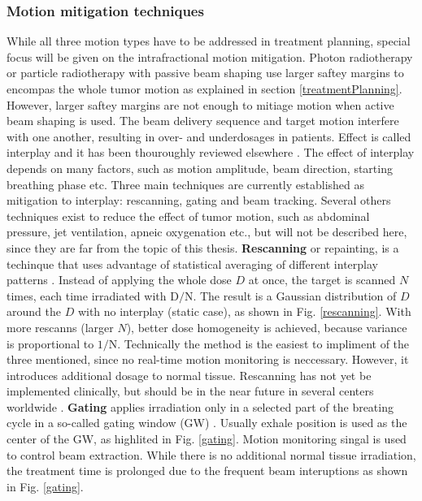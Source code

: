 \documentclass[type=dr, dr=rernat, accentcolor=tud7b,colorbacktitle, bigchapter, openright, twoside, 12pt ]{tudthesis}
\begin{document}
\subsubsection{Motion mitigation techniques}


While all three motion types have to be addressed in treatment planning, special focus will be given on the intrafractional motion mitigation. Photon radiotherapy or particle radiotherapy with passive beam shaping 
use larger saftey margins to encompas the whole tumor motion as explained in section \ref{treatmentPlanning}. However, larger saftey margins are not enough to mitiage motion when active beam shaping is used. The beam delivery 
sequence and target motion interfere with one another, resulting in over- and underdosages in patients. Effect is called interplay and it has been thouroughly reviewed elsewhere \cite{Phillips1992,Bert2008}. The effect of interplay depends
on many factors, such as motion amplitude, beam direction, starting breathing phase etc. Three main techniques are currently established as mitigation to interplay: rescanning, gating and beam tracking. Several others techniques exist
to reduce the effect of tumor motion, such as abdominal pressure, jet ventilation, apneic oxygenation etc., but will not be described here, since they are far from the topic of this thesis.
\newline
\textbf{Rescanning} or repainting, is a techinque that uses advantage of statistical averaging of different interplay patterns \cite{Phillips1992}. Instead of applying the whole dose $D$ at once, the target is scanned $N$ times, each
time irradiated with $\mathrm{D}/\mathrm{N}$. The result is a Gaussian distribution of $D$ around the $D$ with no interplay (static case), as shown in Fig. \ref{rescanning}. With more rescanns (larger $N$), better dose homogeneity is achieved, because variance is proportional
to $\mathrm{1}/\mathrm{N}$. Technically the method is the easiest to impliment of the three mentioned, since no real-time motion monitoring is neccessary. However, it introduces additional dosage to normal tissue. Rescanning has not yet be
implemented clinically, but should be in the near future in several centers worldwide \cite{Furukawa2007, Zenklusen2010}.
\newline
\textbf{Gating} applies irradiation only in a selected part of the breating cycle in a so-called gating window (GW) \cite{Minohara2000,Lu2006}. Usually exhale position is used as the center of the GW, as highlited in Fig. \ref{gating}.
Motion monitoring singal is used to control beam extraction. While there is no additional normal tissue irradiation, the treatment time is prolonged due to the frequent beam interuptions as shown in Fig. \ref{gating}.
\end{document}
